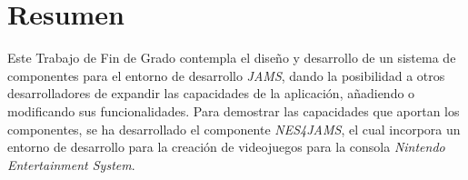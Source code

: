 \chapter{Resumen} \label{ch:resumen}

Este Trabajo de Fin de Grado contempla el diseño y desarrollo de un
sistema de componentes para el entorno de desarrollo \textit{JAMS},
dando la posibilidad a otros desarrolladores de expandir las capacidades
de la aplicación, añadiendo o modificando sus funcionalidades.
Para demostrar las capacidades que aportan los componentes, se ha
desarrollado el componente \textit{NES4JAMS}, el cual incorpora un
entorno de desarrollo para la creación de videojuegos
para la consola \textit{Nintendo Entertainment System}.